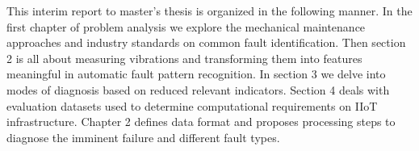 This interim report to master's thesis is organized in the following manner. In the first chapter of problem analysis we explore the mechanical maintenance approaches and industry standards on common fault identification. Then section 2 is all about measuring vibrations and transforming them into features meaningful in automatic fault pattern recognition. In section 3 we delve into modes of diagnosis based on reduced relevant indicators. Section 4 deals with evaluation datasets used to determine computational requirements on IIoT infrastructure. Chapter 2 defines data format and proposes processing steps to diagnose the imminent failure and different fault types.